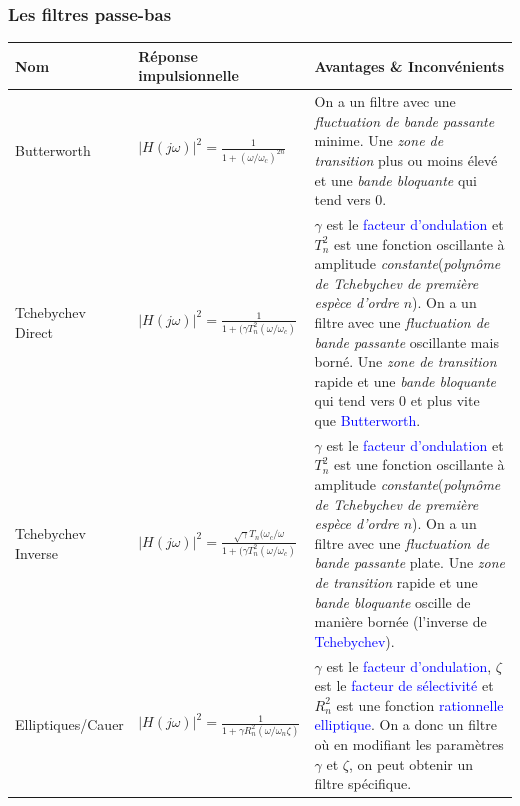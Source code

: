 \documentclass{report}
\begin{document}
\subsubsection{Les filtres passe-bas}
\begin{center}
\begin{tabular}{|m{3cm}|m{5cm}|m{7cm}|}
\hline
\cellcolor[gray]{0.8} Nom &\cellcolor[gray]{0.8} Réponse impulsionnelle & \cellcolor[gray]{0.8} Avantages \& Inconvénients\\
\hline
Butterworth & $|H(j\omega)|^2 = \frac{1}{1+(\omega/\omega_c)^{2n}}$ & On a un filtre avec une \textit{fluctuation de bande passante} minime. Une \textit{zone de transition} plus ou moins élevé et une \textit{bande bloquante} qui tend vers 0.\\
\hline
Tchebychev Direct & $|H(j\omega)|^2 = \frac{1}{1+(\gamma T_n^2 (\omega /\omega_c)}$ &$\gamma$ est le \textcolor{blue}{facteur d'ondulation} et $T_n^2$ est une fonction oscillante à amplitude \textit{constante}(\textit{polynôme de Tchebychev de première espèce d'ordre $n$}). On a un filtre avec une \textit{fluctuation de bande passante} oscillante mais borné. Une \textit{zone de transition} rapide et une \textit{bande bloquante} qui tend vers 0 et plus vite que \textcolor{blue}{Butterworth}.\\
\hline
Tchebychev Inverse & $|H(j\omega)|^2 = \frac{\sqrt{\gamma}T_n(\omega_c/\omega}{1+(\gamma T_n^2 (\omega /\omega_c)}$ &$\gamma$ est le \textcolor{blue}{facteur d'ondulation} et $T_n^2$ est une fonction oscillante à amplitude \textit{constante}(\textit{polynôme de Tchebychev de première espèce d'ordre $n$}). On a un filtre avec une \textit{fluctuation de bande passante} plate. Une \textit{zone de transition} rapide et une \textit{bande bloquante} oscille de manière bornée (l'inverse de \textcolor{blue}{Tchebychev}).\\
\hline
Elliptiques/Cauer & $|H(j\omega)|^2 = \frac{1}{1+ \gamma R_n^2(\omega / \omega_n \zeta)}$ &$\gamma$ est le \textcolor{blue}{facteur d'ondulation}, $\zeta$ est le \textcolor{blue}{facteur de sélectivité} et $R_n^2$ est une fonction \textcolor{blue}{rationnelle elliptique}. On a donc un filtre où en modifiant les paramètres $\gamma$ et $\zeta$, on peut obtenir un filtre spécifique.\\
\hline
\end{tabular}
\end{center}
\end{document}
